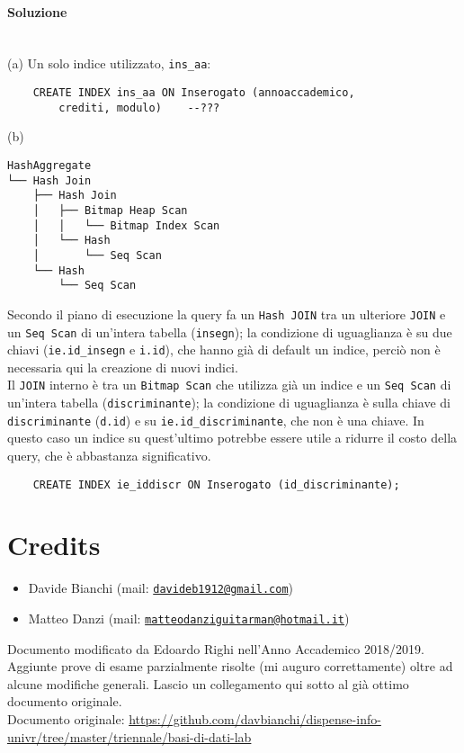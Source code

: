 \documentclass[a4paper, 10pt, titlepage]{article}
\newcommand{\mail}[1]{\href{mailto:#1}{\texttt{#1}}}
\begin{document}
\paragraph{Soluzione}\dotfill
\\(a) Un solo indice utilizzato, \lstinline|ins_aa|:
\begin{lstlisting}
	CREATE INDEX ins_aa ON Inserogato (annoaccademico, 
		crediti, modulo)	--???
\end{lstlisting}
(b) 
\begin{verbatim}
HashAggregate
└── Hash Join
    ├── Hash Join
    │   ├── Bitmap Heap Scan
    │   │   └── Bitmap Index Scan
    │   └── Hash
    │       └── Seq Scan
    └── Hash
        └── Seq Scan
\end{verbatim}
Secondo il piano di esecuzione la query fa un \lstinline|Hash JOIN| tra un ulteriore \lstinline|JOIN| e un \lstinline|Seq Scan| di un'intera tabella (\lstinline|insegn|); la condizione di uguaglianza è su due chiavi (\lstinline|ie.id_insegn| e \lstinline|i.id|), che hanno già di default un indice, perciò non è necessaria qui la creazione di nuovi indici.\\
Il \lstinline|JOIN| interno è tra un \lstinline|Bitmap Scan| che utilizza già un indice e un \lstinline|Seq Scan| di un'intera tabella (\lstinline|discriminante|); la condizione di uguaglianza è sulla chiave di \lstinline|discriminante| (\lstinline|d.id|) e su \lstinline|ie.id_discriminante|, che non è una chiave. In questo caso un indice su quest'ultimo potrebbe essere utile a ridurre il costo della query, che è abbastanza significativo.
\begin{lstlisting}
	CREATE INDEX ie_iddiscr ON Inserogato (id_discriminante);
\end{lstlisting}
\newpage

\section{Credits}
\begin{itemize}
\item Davide Bianchi (mail: \mail{davideb1912@gmail.com})
\item Matteo Danzi (mail: \mail{matteodanziguitarman@hotmail.it})
\end{itemize}
Documento modificato da Edoardo Righi nell'Anno Accademico 2018/2019. Aggiunte prove di esame parzialmente risolte (mi auguro correttamente) oltre ad alcune modifiche generali. Lascio un collegamento qui sotto al già ottimo documento originale. \medskip \\
Documento originale: {\scriptsize \url{https://github.com/davbianchi/dispense-info-univr/tree/master/triennale/basi-di-dati-lab}}
			
\end{document}
